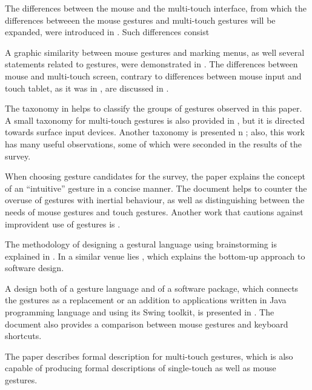 \documentclass{aes130}
\begin{document}
The differences between the mouse and the multi-touch interface, from which the differences betweeen
the mouse gestures and multi-touch gestures will be expanded, were introduced in \cite{Buxton:1985:ITT:325334.325239}.
Such differences consist 

A graphic similarity between mouse gestures and marking menus, as well several statements related
to gestures, were demonstrated in \cite{Kurtenbach:1993:LEP:164632.164977}.
The differences between mouse and multi-touch screen, contrary to differences between mouse input
and touch tablet, as it was in \cite{Kurtenbach:1993:LEP:164632.164977}, are discussed in
\cite{Forlines:2007:DVM:1240624.1240726}.

The taxonomy in \cite{ecs11149} helps to classify the groups of gestures observed in this paper.
A small taxonomy for multi-touch gestures is also provided in \cite{Wigdor:2010:ANU:1842993.1842997},
but it is directed towards surface input devices. Another taxonomy is presented 
n \cite{Wobbrock:2009:UGS:1518701.1518866}; also, this work has many useful observations,
some of which were seconded in the results of the survey.

When choosing gesture candidates for the survey, the paper \cite{Naumann:2007:IUU:1784197.1784212}
explains the concept of an ``intuitive'' gesture in a concise manner. The document \cite{Lee:2009:EEP:1520340.1520667}
helps to counter the overuse of gestures with inertial behaviour, as well as distinguishing between
the needs of mouse gestures and touch gestures. Another work that cautions against improvident use
of gestures is \cite{Norman:2010:GIS:1836216.1836228}.

The methodology of designing a gestural language using brainstorming is explained in
\cite{Akers:2007:ODM:1240866.1240868}. In a similar venue lies \cite{SalatBottomUpApproach}, which explains
the bottom-up approach to software design.

A design both of a gesture language and of a software package, which connects the gestures
as a replacement or an addition to applications written in Java programming language and using
its Swing toolkit, is presented in \cite{Appert:2009:USC:1518701.1519052}. The document also
provides a comparison between mouse gestures and keyboard shortcuts.

The paper \cite{Kammer:2010:TFM:1936652.1936662} describes formal description for multi-touch gestures,
which is also capable of producing formal descriptions of single-touch as well as mouse gestures.
\end{document}
